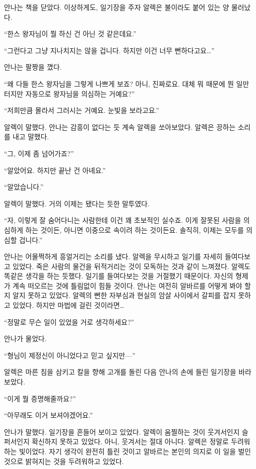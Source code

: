 안나는 책을 닫았다. 이상하게도, 일기장을 주자 알렉은 불이라도 붙어 있는 양 물러났다.

``한스 왕자님이 뭘 하신 건 아닌 것 같은데요.''

``그런다고 그냥 지나치지는 않을 겁니다. 하지만 이건 너무 뻔하다고요\ldots''

안나는 팔짱을 꼈다.

``왜 다들 한스 왕자님을 그렇게 나쁘게 보죠? 아니, 진짜로요. 대체 뭐 때문에 뭔 일만 터지만 자동으로 왕자님을 의심하는 거예요?''

``저희만큼 몰라서 그러시는 거예요. 눈빛을 보라고요.''

알렉이 말했다. 안나는 감흥이 없다는 듯 계속 알렉을 쏘아보았다. 알렉은 끙하는 소리를 내고 말했다.

``그, 이제 좀 넘어가죠?''

``알았어요. 하지만 끝난 건 아녜요.''

``알았습니다.''

알렉이 말했다. 거의 이제는 됐다는 듯한 말투였다.

``자, 이렇게 잘 숨어다니는 사람한테 이건 꽤 초보적인 실수죠. 이게 잘못된 사람을 의심하게 하는 것이든, 아니면 이중으로 속이려 하는 것이든요. 솔직히, 이제는 모두를 의심할 겁니다.''

안나는 어물쩍하게 흥얼거리는 소리를 냈다. 알렉을 무시하고 일기를 자세히 들여다보고 있었다. 죽은 사람의 물건을 뒤적거리는 것이 모독하는 것과 같이 느껴졌다. 알렉도 똑같은 생각을 하는 듯했다. 일기를 들여다보는 것을 거절했기 때문이다. 자신의 형제가 계속 떠오르는 것에 틀림없이 힘들 것이다. 안나는 여전히 알바르를 어떻게 봐야 할지 알지 못하고 있었다. 알렉의 뻔한 자부심과 현실의 암살 사이에서 갈피를 잡지 못하고 있었다. 하지만 마법에 걸린 것이라면\ldots

``정말로 무슨 일이 있었을 거로 생각하세요?''

안나가 물었다.

`` 형님이 제정신이 아니었다고 믿고 싶지만—''

알렉은 마른 침을 삼키고 칼을 향해 고개를 돌린 다음 안나의 손에 들린 일기장을 바라보았다.

``이게 뭘 증명해줄까요?''

``아무래도 이거 보셔야겠어요.''

안나가 말했다. 일기장을 흔들어 보이고 있었다. 알렉이 움찔하는 것이 웃겨서인지 슬퍼서인지 확신하지 못하고 있었다. 아니, 웃겨서는 절대 아니다. 알렉은 정말로 두려워하는 빛이었다. 자기 생각이 완전히 틀린 것이고 알바르는 본인의 의지로 이 일을 벌인 것으로 밝혀지는 것을 두려워하고 있었다.

